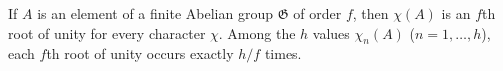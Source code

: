 If $A$ is an element of a finite Abelian group $\mathfrak{G}$ of order $f$, then $\chi(A)$ is an $f$th root of unity for every character $\chi$. Among the $h$ values $\chi_n(A)$ ($n = 1, \ldots, h$), each $f$th root of unity occurs exactly $h/f$ times.

